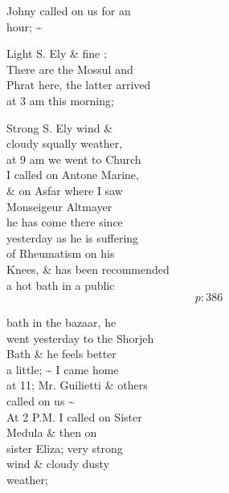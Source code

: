 \documentclass{report}
\begin{document}
	\par{
 	Johny called on us for an\ \\hour; \~{}\ \\
	}

	\par{
 	Light S. Ely \& fine ;\ \\There are the Mossul and\ \\Phrat here, the latter arrived\ \\at 3 am this morning;\ \\
	}

	\par{
 	Strong S. Ely wind \&\ \\cloudy squally weather,\ \\at 9 am we went to Church\ \\I called on Antone Marine,\ \\\& on Asfar where I saw\ \\Monseigeur Altmayer\ \\he has come there since\ \\yesterday as he is suffering\ \\of Rheumatism on his\ \\Knees, \& has been recommended\ \\a hot bath in a public\ \\
  \[p: 386 \]

	}



	\par{
 	bath in the bazaar, he\ \\went yesterday to the Shorjeh\ \\Bath \& he feels better\ \\a little; \~{} I came home\ \\at 11; Mr. Guilietti \& others\ \\called on us \~{}\ \\At 2 P.M. I called on Sister\ \\Medula \& then on\ \\sister Eliza; very strong\ \\wind \& cloudy dusty\ \\weather;\ \\
	}
\end{document}
